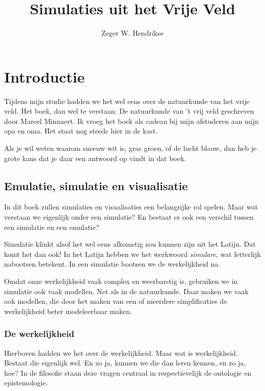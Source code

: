 \documentclass{article}      %
\title{Simulaties uit het Vrije Veld}  %
\author{Zeger W. Hendrikse}      %
\begin{document}

\maketitle                   %


\section{Introductie}

Tijdens mijn studie hadden we het wel eens over de natuurkunde van het vrije veld.
Het boek, dan wel te verstaan: De natuurkunde van 't vrij veld geschreven door Marcel Minnaert.
Ik vroeg het boek als cadeau bij mijn afstuderen aan mijn opa en oma. Het staat
nog steeds hier in de kast. 

Als je wil weten waarom sneeuw wit is, gras groen, of de lucht blauw, dan heb je
grote kans dat je daar een antwoord op vindt in dat boek. 

                             
\subsection{Emulatie, simulatie en visualisatie}

In dit boek zullen simulaties en visualisaties een belangrijke rol spelen.
Maar wat verstaan we eigenlijk onder een simulatie? En bestaat er ook een 
verschil tussen een simulatie en een emulatie?

Simulatie klinkt alsof het wel eens afkomstig zou kunnen zijn uit het Latijn.
Dat komt het dan ook! In het Latijn hebben we het werkwoord {\it simulare}, 
wat letterlijk nabootsen betekent. In een simulatie bootsen we de werkelijkheid
na. 

Omdat onze werkelijkheid vaak complex en weerbarstig is, gebruiken we in 
simulatie ook vaak modellen. Net als in de natuurkunde. Daar maken we vaak
ook modellen, die door het maken van een of meerdere simplificaties de 
werkelijkheid beter modeleerbaar maken.

\subsubsection{De werkelijkheid}

Hierboven hadden we het over de werkelijkheid. Maar wat is werkelijkheid. 
Bestaat die eigenlijk wel. En zo ja, kunnen we die dan leren kennen, en zo ja, 
hoe? In de filosofie staan deze vragen centraal in respectievelijk 
de ontologie en epistemologie. 
\end{document}

